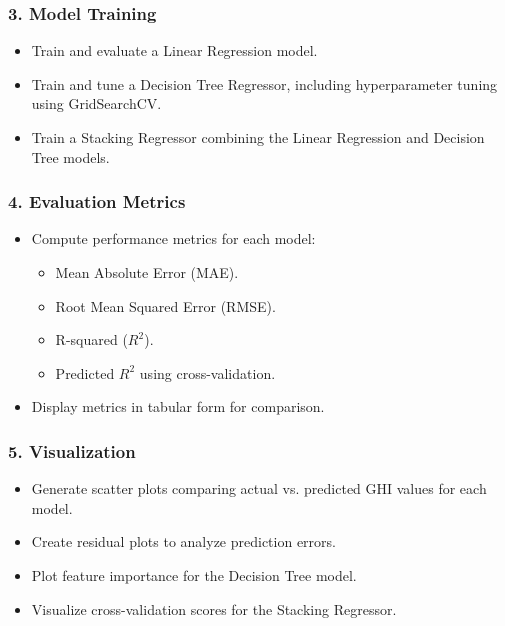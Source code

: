 \documentclass[10pt,twocolumn]{article}
\begin{document}
\begin{itemize}
\subsubsection*{3. Model Training}
\begin{itemize}
    \item Train and evaluate a Linear Regression model.
    \item Train and tune a Decision Tree Regressor, including hyperparameter tuning using GridSearchCV.
    \item Train a Stacking Regressor combining the Linear Regression and Decision Tree models.
\end{itemize}

\subsubsection*{4. Evaluation Metrics}
\begin{itemize}
    \item Compute performance metrics for each model:
    \begin{itemize}
        \item Mean Absolute Error (MAE).
        \item Root Mean Squared Error (RMSE).
        \item R-squared (\( R^2 \)).
        \item Predicted \( R^2 \) using cross-validation.
    \end{itemize}
    \item Display metrics in tabular form for comparison.
\end{itemize}

\subsubsection*{5. Visualization}
\begin{itemize}
    \item Generate scatter plots comparing actual vs. predicted GHI values for each model.
    \item Create residual plots to analyze prediction errors.
    \item Plot feature importance for the Decision Tree model.
    \item Visualize cross-validation scores for the Stacking Regressor.
\end{itemize}


\end{itemize}
\end{document}
